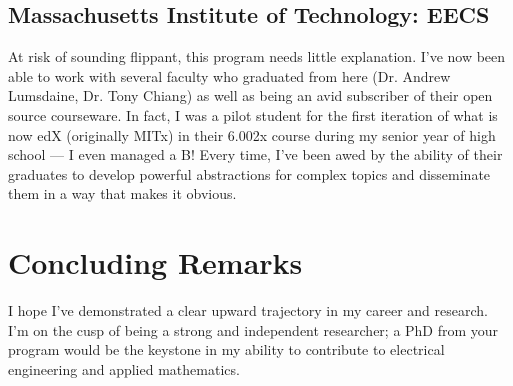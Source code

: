 \documentclass[letterpaper]{article}
\begin{document}
\subsection*{Massachusetts Institute of Technology: EECS}
At risk of sounding flippant, this program needs little explanation. I've now been able to
work with several faculty who graduated from here (Dr. Andrew Lumsdaine, Dr. Tony Chiang)
as well as being an avid subscriber of their open source courseware. In fact, I was a
pilot student for the first iteration of what is now edX (originally MITx) in their
6.002x course during my senior year of high school --- I even managed a B! Every time,
I've been awed by the ability of their graduates to develop powerful abstractions for
complex topics and disseminate them in a way that makes it obvious.

\section*{Concluding Remarks}
I hope I've demonstrated a clear upward trajectory in my career and research.
I'm on the cusp of being a strong and independent researcher; a PhD from your program
would be the keystone in my ability to contribute to electrical engineering and applied
mathematics.
\end{document}
